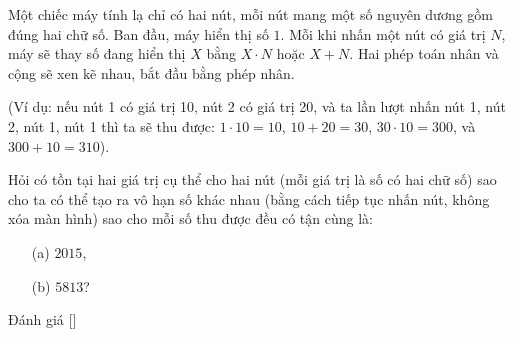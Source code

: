 \ifshowproblem
\begin{problem}\label{problem:CPS-2015-P4}
    Một chiếc máy tính lạ chỉ có hai nút, mỗi nút mang một số nguyên dương gồm đúng hai chữ số. Ban đầu, máy hiển thị số \(1\).  
    Mỗi khi nhấn một nút có giá trị \(N\), máy sẽ thay số đang hiển thị \(X\) bằng \(X \cdot N\) hoặc \(X + N\).  
    Hai phép toán nhân và cộng sẽ xen kẽ nhau, bắt đầu bằng phép nhân.
    
    (Ví dụ: nếu nút 1 có giá trị 10, nút 2 có giá trị 20, và ta lần lượt nhấn nút 1, nút 2, nút 1, nút 1 thì ta sẽ thu được:
    \(1 \cdot 10 = 10\), \(10 + 20 = 30\), \(30 \cdot 10 = 300\), và \(300 + 10 = 310\)).
    
    Hỏi có tồn tại hai giá trị cụ thể cho hai nút (mỗi giá trị là số có hai chữ số) sao cho ta có thể tạo ra vô hạn số khác nhau  
    (bằng cách tiếp tục nhấn nút, không xóa màn hình) sao cho mỗi số thu được đều có tận cùng là:
    \begin{itemize}
        \item[(a)] \(2015\),
        \item[(b)] \(5813\)?
    \end{itemize} 
\end{problem}
\fi

\ifshowinfo
Đánh giá [\textbf{}]
\fi